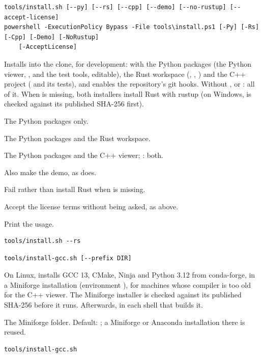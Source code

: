 \begin{lstlisting}[style=signature]
tools/install.sh [--py] [--rs] [--cpp] [--demo] [--no-rustup] [--accept-license]
powershell -ExecutionPolicy Bypass -File tools\install.ps1 [-Py] [-Rs] [-Cpp] [-Demo] [-NoRustup]
    [-AcceptLicense]
\end{lstlisting}
Installs into the clone, for development:  with the Python packages (the Python
viewer, ,  and the test tools, editable), the Rust workspace
(, , ) and the C++ project ( and its tests),
and enables the repository's git hooks. Without ,  or : all
of it. When  is missing, both installers install Rust with rustup (on Windows,
 is checked against its published SHA-256 first).
\begin{params}
\item[--py] The Python packages only.
\item[--rs] The Python packages and the Rust workspace.
\item[--cpp] The Python packages and the C++ viewer; : both.
\item[--demo] Also make the demo, as  does.
\item[--no-rustup] Fail rather than install Rust when  is missing.
\item[--accept-license] Accept the license terms without being asked, as above.
\item[-h, --help] Print the usage.
\end{params}
\begin{lstlisting}[style=shell]
tools/install.sh --rs
\end{lstlisting}

\begin{lstlisting}[style=signature]
tools/install-gcc.sh [--prefix DIR]
\end{lstlisting}
On Linux, installs GCC 13, CMake, Ninja and Python 3.12 from conda-forge, in a Miniforge
installation (environment ), for machines whose compiler is too old for the C++
viewer. The Miniforge installer is checked against its published SHA-256 before it runs.
Afterwards,  in each shell
that builds it.
\begin{params}
\item[--prefix DIR] The Miniforge folder. Default: ; a Miniforge
  or Anaconda installation there is reused.
\end{params}
\begin{lstlisting}[style=shell]
tools/install-gcc.sh
\end{lstlisting}

